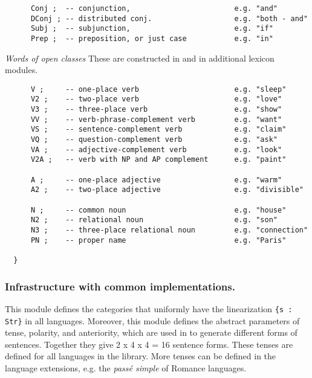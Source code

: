 \documentclass[11pt,a4paper]{article}
\newcommand{\commOut}[1]{}
\newcommand{\subsubsubsection}[1]{\textit{#1}}
\begin{document}
\begin{verbatim}
      Conj ;  -- conjunction,                        e.g. "and"
      DConj ; -- distributed conj.                   e.g. "both - and"
      Subj ;  -- subjunction,                        e.g. "if"
      Prep ;  -- preposition, or just case           e.g. "in"
\end{verbatim}

\subsubsubsection{Words of open classes}
These are constructed in  and in 
additional lexicon modules.

\begin{verbatim}
      V ;     -- one-place verb                      e.g. "sleep" 
      V2 ;    -- two-place verb                      e.g. "love"
      V3 ;    -- three-place verb                    e.g. "show"
      VV ;    -- verb-phrase-complement verb         e.g. "want"
      VS ;    -- sentence-complement verb            e.g. "claim"
      VQ ;    -- question-complement verb            e.g. "ask"
      VA ;    -- adjective-complement verb           e.g. "look"
      V2A ;   -- verb with NP and AP complement      e.g. "paint"
  
      A ;     -- one-place adjective                 e.g. "warm"
      A2 ;    -- two-place adjective                 e.g. "divisible"
  
      N ;     -- common noun                         e.g. "house"
      N2 ;    -- relational noun                     e.g. "son"
      N3 ;    -- three-place relational noun         e.g. "connection"
      PN ;    -- proper name                         e.g. "Paris"
  
  }
\end{verbatim}

\commOut{Produced by 
gfdoc - a rudimentary GF document generator.
(c) Aarne Ranta (\htmladdnormallink{aarne@cs.chalmers.se}{mailto:aarne@cs.chalmers.se}) 2002 under GNU GPL.}


\subsubsection{Infrastructure with common implementations.}
This module defines the categories that uniformly have the linearization
\texttt{\{s : Str\}} in all languages. 
Moreover, this module defines the abstract parameters of tense, polarity, and
anteriority, which are used in  to generate different
forms of sentences. Together they give 2 x 4 x 4 = 16 sentence forms.
These tenses are defined for all languages in the library. More tenses
can be defined in the language extensions, e.g. the \textit{passé simple} of
Romance languages.
\end{document}
